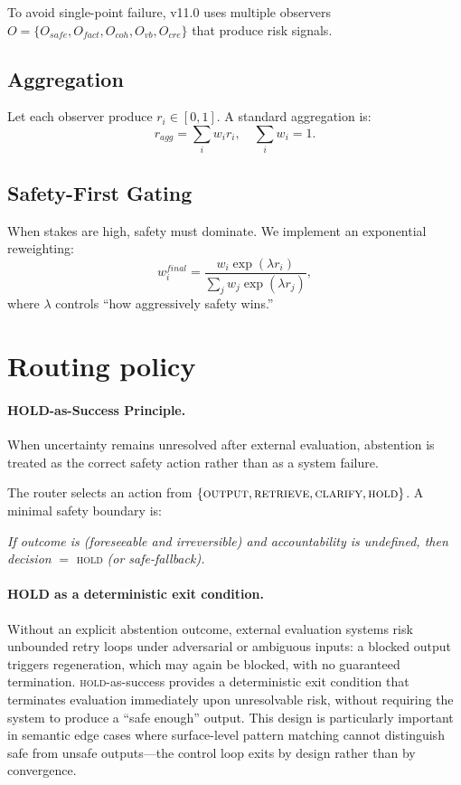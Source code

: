 \documentclass[11pt,a4paper]{article}
\begin{document}
To avoid single-point failure, v11.0 uses multiple observers
$O = \{O_{safe}, O_{fact}, O_{coh}, O_{vb}, O_{cre}\}$ that produce risk signals.

\subsection{Aggregation}
Let each observer produce $r_i \in [0,1]$. A standard aggregation is:
\begin{equation}
r_{agg} = \sum_i w_i r_i, \quad \sum_i w_i = 1.
\end{equation}

\subsection{Safety-First Gating}
When stakes are high, safety must dominate. We implement an exponential reweighting:
\begin{equation}
w_i^{final} = \frac{w_i \exp(\lambda r_i)}{\sum_j w_j \exp(\lambda r_j)},
\end{equation}
where $\lambda$ controls ``how aggressively safety wins.''

\section{Routing policy}

\paragraph{HOLD-as-Success Principle.}
When uncertainty remains unresolved after external evaluation, abstention is treated as the
correct safety action rather than as a system failure.

The router selects an action from
$\{\textsc{output}, \textsc{retrieve}, \textsc{clarify}, \textsc{hold}\}$.
A minimal safety boundary is:

\textit{If outcome is (foreseeable and irreversible) and accountability is undefined, then
decision} $=$ \textsc{hold} \textit{(or safe-fallback).}

\paragraph{HOLD as a deterministic exit condition.}
Without an explicit abstention outcome, external evaluation systems risk unbounded
retry loops under adversarial or ambiguous inputs: a blocked output triggers
regeneration, which may again be blocked, with no guaranteed termination.
\textsc{hold}-as-success provides a deterministic exit condition that terminates
evaluation immediately upon unresolvable risk, without requiring the system to
produce a ``safe enough'' output. This design is particularly important in
semantic edge cases where surface-level pattern matching cannot distinguish
safe from unsafe outputs---the control loop exits by design rather than by
convergence.
\end{document}
